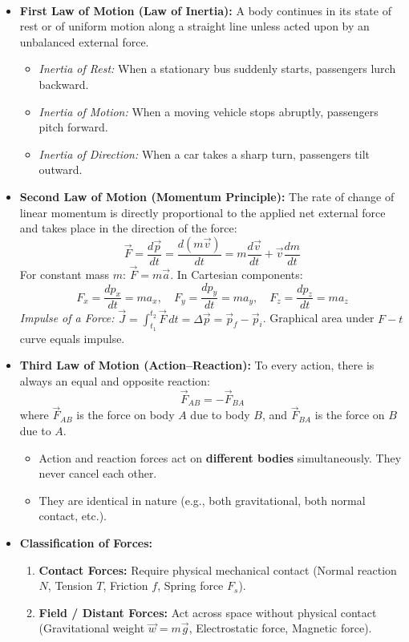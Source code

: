 \documentclass[11pt,a4paper]{article}
\begin{document}
\noindent{\large\textbf{\textsf{\textcolor{primaryDark}{1.1 Fundamental Laws and Types of Forces}}}}\\[3pt]
\begin{itemize}[leftmargin=14pt,itemsep=2.5pt]
  \item \textbf{First Law of Motion (Law of Inertia):} A body continues in its state of rest or of uniform motion along a straight line unless acted upon by an unbalanced external force.
  \begin{itemize}[leftmargin=12pt,itemsep=1pt]
    \item \textit{Inertia of Rest:} When a stationary bus suddenly starts, passengers lurch backward.
    \item \textit{Inertia of Motion:} When a moving vehicle stops abruptly, passengers pitch forward.
    \item \textit{Inertia of Direction:} When a car takes a sharp turn, passengers tilt outward.
  \end{itemize}
  \item \textbf{Second Law of Motion (Momentum Principle):} The rate of change of linear momentum is directly proportional to the applied net external force and takes place in the direction of the force:
  \[
    \vec{F} = \frac{d\vec{p}}{dt} = \frac{d(m\vec{v})}{dt} = m\frac{d\vec{v}}{dt} + \vec{v}\frac{dm}{dt}
  \]
  For constant mass $m$: $\vec{F} = m\vec{a}$. In Cartesian components:
  \[
    F_x = \frac{dp_x}{dt} = m a_x, \quad F_y = \frac{dp_y}{dt} = m a_y, \quad F_z = \frac{dp_z}{dt} = m a_z
  \]
  \textit{Impulse of a Force:} $\vec{J} = \int_{t_1}^{t_2} \vec{F}\,dt = \Delta\vec{p} = \vec{p}_f - \vec{p}_i$. Graphical area under $F-t$ curve equals impulse.
  \item \textbf{Third Law of Motion (Action--Reaction):} To every action, there is always an equal and opposite reaction:
  \[
    \vec{F}_{AB} = -\vec{F}_{BA}
  \]
  where $\vec{F}_{AB}$ is the force on body $A$ due to body $B$, and $\vec{F}_{BA}$ is the force on $B$ due to $A$.
  \begin{itemize}[leftmargin=12pt,itemsep=1pt]
    \item Action and reaction forces act on \textbf{different bodies} simultaneously. They never cancel each other.
    \item They are identical in nature (e.g., both gravitational, both normal contact, etc.).
  \end{itemize}
  \item \textbf{Classification of Forces:}
  \begin{enumerate}[label=(\alph*),leftmargin=12pt,itemsep=1.5pt]
    \item \textbf{Contact Forces:} Require physical mechanical contact (Normal reaction $N$, Tension $T$, Friction $f$, Spring force $F_s$).
    \item \textbf{Field / Distant Forces:} Act across space without physical contact (Gravitational weight $\vec{w} = m\vec{g}$, Electrostatic force, Magnetic force).
  \end{enumerate}
\end{itemize}
\end{document}
